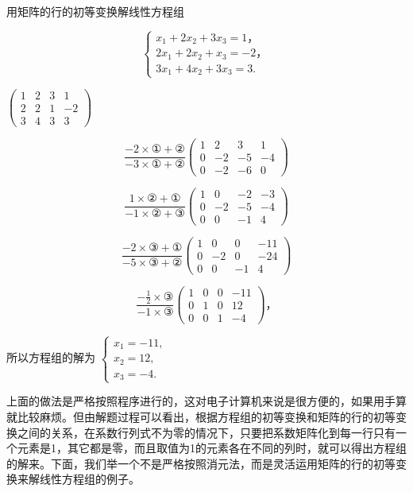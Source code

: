 用矩阵的行的初等变换解线性方程组

\[
\left\{ \begin{array}{l} x _ {1} + 2 x _ {2} + 3 x _ {3} = 1\text{，} \\ 2 x _ {1} + 2 x _ {2} + x _ {3} = - 2\text{，} \\ 3 x _ {1} + 4 x _ {2} + 3 x _ {3} = 3. \end{array} \right.
\]

\(\left( \begin{array}{cccc}1 & 2 & 3 & 1\\ 2 & 2 & 1 & -2\\ 3 & 4 & 3 & 3 \end{array} \right)\)

\[
\frac {- 2 \times ① + ②}{- 3 \times ① + ②} \left( \begin{array}{cccc} 1 & 2 & 3 & 1 \\ 0 & - 2 & - 5 & - 4 \\ 0 & - 2 & - 6 & 0 \end{array} \right)
\]

\[
\frac {1 \times ② + ①}{- 1 \times ② + ③} \left( \begin{array}{cccc} 1 & 0 & - 2 & - 3 \\ 0 & - 2 & - 5 & - 4 \\ 0 & 0 & - 1 & 4 \end{array} \right)
\]

\[
\frac {- 2 \times ③ + ①}{- 5 \times ③ + ②} \left( \begin{array}{cccc} 1 & 0 & 0 & - 11 \\ 0 & - 2 & 0 & - 24 \\ 0 & 0 & - 1 & 4 \end{array} \right)
\]

\[
\frac {- \frac {1}{2} \times ③}{- 1 \times ③} \left( \begin{array}{cccc} 1 & 0 & 0 & - 11 \\ 0 & 1 & 0 & 12 \\ 0 & 0 & 1 & - 4 \end{array} \right)\text{，}
\]

所以方程组的解为
\(\left\{ \begin{array}{l} x_{1} = -11, \\ x_{2} = 12, \\ x_{3} = -4. \end{array} \right.\)

上面的做法是严格按照程序进行的，这对电子计算机来说是很方便的，如果用手算就比较麻烦。但由解题过程可以看出，根据方程组的初等变换和矩阵的行的初等变换之间的关系，在系数行列式不为零的情况下，只要把系数矩阵化到每一行只有一个元素是1，其它都是零，而且取值为1的元素各在不同的列时，就可以得出方程组的解来。下面，我们举一个不是严格按照消元法，而是灵活运用矩阵的行的初等变换来解线性方程组的例子。

